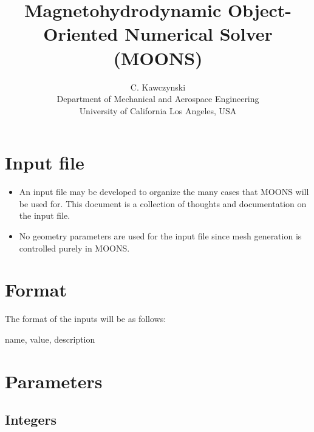 \documentclass[11pt]{article}
\begin{document}
\doublespacing
\title{Magnetohydrodynamic Object-Oriented Numerical Solver (MOONS)}
\author{C. Kawczynski \\
Department of Mechanical and Aerospace Engineering \\
University of California Los Angeles, USA\\
}
\maketitle

\section{Input file}

\begin{itemize}
\item An input file may be developed to organize the many cases that MOONS will be used for. This document is a collection of thoughts and documentation on the input file.
\item No geometry parameters are used for the input file since mesh generation is controlled purely in MOONS.
\end{itemize}



\section{Format}
The format of the inputs will be as follows:

name, value, description

\section{Parameters}
\subsection{Integers}
\end{document}
